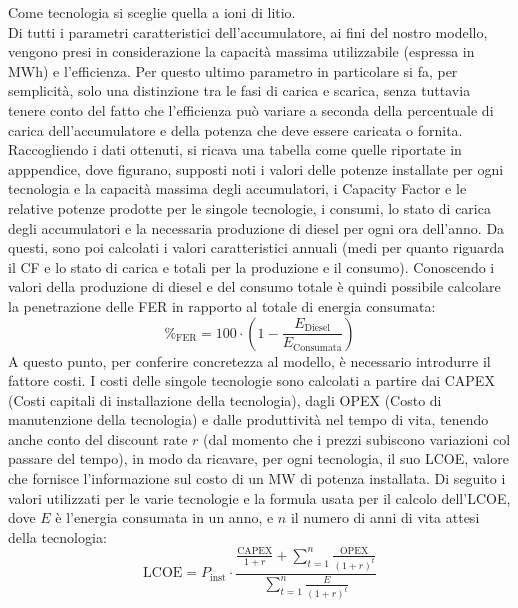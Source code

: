 \documentclass[fleqn,10pt]{SelfArx} %
\begin{document}
Come tecnologia si sceglie quella a ioni di litio. \\
Di tutti i parametri caratteristici dell'accumulatore, ai fini del nostro modello, vengono presi in
considerazione la capacità massima utilizzabile (espressa in MWh) e l'efficienza.
Per questo ultimo parametro in particolare si fa, per semplicità, solo una distinzione tra le fasi di carica e scarica, senza tuttavia tenere conto del fatto che l'efficienza può variare a seconda della percentuale di carica dell'accumulatore e della potenza che deve essere caricata o fornita. \\
Raccogliendo i dati ottenuti, si ricava una tabella come quelle riportate in apppendice, dove figurano, supposti noti i valori delle potenze installate per ogni tecnologia e la capacità massima degli accumulatori, i Capacity Factor e le relative potenze prodotte per le singole tecnologie, i consumi, lo stato di carica degli accumulatori e la necessaria produzione di diesel per ogni ora dell'anno. %
Da questi, sono poi calcolati i valori caratteristici annuali (medi per quanto riguarda il CF e lo stato di carica e totali per la produzione e il consumo).
Conoscendo i valori della produzione di diesel e del consumo totale è quindi possibile calcolare la penetrazione delle FER in rapporto al totale di energia consumata:
\begin{equation}
	\%_\text{FER} = 100 \cdot \left(1 - \frac{E_{\text{Diesel}}}{E_{\text{Consumata}}}\right)
\end{equation}
A questo punto, per conferire concretezza al modello, è necessario introdurre il fattore costi.
I costi delle singole tecnologie sono calcolati a partire dai CAPEX (Costi capitali di installazione della tecnologia), dagli OPEX (Costo di manutenzione della tecnologia) e dalle produttività nel tempo di vita, tenendo anche conto del discount rate \(r\) (dal momento che i prezzi subiscono variazioni col passare del tempo), in modo da ricavare, per ogni tecnologia, il suo LCOE, valore che fornisce l'informazione sul costo di un MW di potenza installata.
Di seguito i valori utilizzati per le varie tecnologie e la formula usata per il calcolo dell'LCOE, dove \(E\) è l'energia consumata in un anno, e \(n\) il numero di anni di vita attesi della tecnologia: 
\begin{equation}
	\text{LCOE} = P_\text{inst} \cdot \frac{\frac{\text{CAPEX}}{1+r} + \sum\limits_{t=1}^n \frac{\text{OPEX}}{(1+r)^t}}{\sum\limits_{t=1}^n \frac{E}{(1+r)^t}}
	\label{eq:lcoe}
\end{equation}
\end{document}
